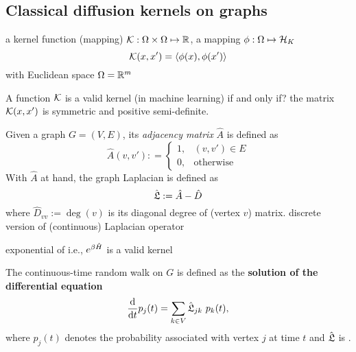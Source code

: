 \subsection{Classical diffusion kernels on graphs}
\cite{kondorDiffusionKernelsGraphs2002}
a kernel function (mapping) $\mathcal{K}: \Omega\times\Omega\mapsto\mathbb{R}$,
a mapping $\phi:\Omega\mapsto\mathcal{H}_K$
\begin{equation}
	\mathcal{K}(x,x') = \langle \phi(x),\phi(x') \rangle
\end{equation}
with Euclidean space $\Omega = \mathbb{R}^m$
\begin{definition}[Kernel]\label{def:kernel}
	A function $\mathcal{K}$ is a valid kernel (in machine learning) if and only if? the matrix $\mathcal{K}(x,x')$ is symmetric and positive semi-definite.
\end{definition}
\begin{definition}\label{def:graph_laplacian}
	Given a graph $G=(V,E)$, its \emph{adjacency matrix} $\hat{A}$ is defined as
	\begin{equation}
		\hat{A}(v,v') : = 
		\begin{cases}
			1, & (v,v') \in E \\
			0, & \text{otherwise}
		\end{cases}
	\end{equation}
	With $\hat{A}$ at hand, the graph Laplacian is defined as
	\begin{equation}
		\hat{\mathfrak{L}}:=\hat{A}-\hat{D}	
	\end{equation}
	where $\hat{D}_{vv}:=\deg(v)$ is its diagonal degree of (vertex $v$) matrix.
	discrete version of (continuous) Laplacian operator
\end{definition}
\begin{lemma}
	exponential of i.e., $e^{\beta \hat{H}}$ is a valid kernel
\end{lemma}

The continuous-time random walk on $G$ is defined as the \textbf{solution of the differential equation}
\begin{equation}
	\dv{t} p_j(t)
	=
	\sum_{k\in V} \hat{\mathfrak{L}}_{jk} \ p_k(t),
	\label{eq:continuous_time_random_walk}
\end{equation}
where $p_j(t)$ denotes the probability associated with vertex $j$ at time $t$
and $\hat{\mathfrak{L}}$ is .

